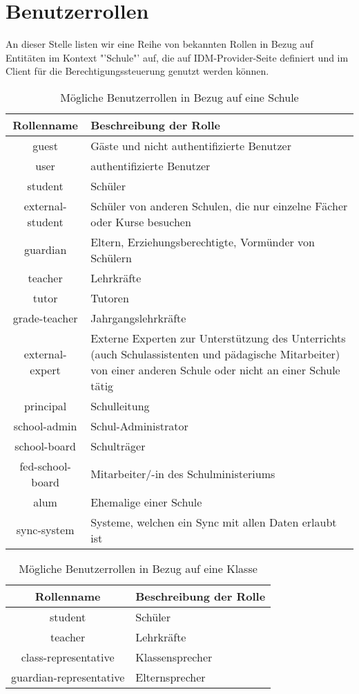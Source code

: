 \section{Benutzerrollen}
\label{Benutzerrollen}
An dieser Stelle listen wir eine Reihe von bekannten Rollen in Bezug auf Entitäten im Kontext "'Schule"' auf, die auf IDM-Provider-Seite definiert und im Client für die Berechtigungssteuerung genutzt werden können.


\begin{table}[htb]
	\begin{tabularx}{\textwidth}{|c|X|}
		\hline
\textbf{Rollenname} & \textbf{Beschreibung der Rolle} \\ \hline
guest & Gäste und nicht authentifizierte Benutzer \\ \hline
user & authentifizierte Benutzer \\ \hline
student & Schüler \\ \hline
external-student & Schüler von anderen Schulen, die nur einzelne Fächer oder Kurse besuchen \\ \hline
guardian & Eltern, Erziehungsberechtigte, Vormünder von Schülern \\ \hline
teacher & Lehrkräfte \\ \hline
tutor & Tutoren \\ \hline
grade-teacher & Jahrgangslehrkräfte \\ \hline
external-expert & Externe Experten zur Unterstützung des Unterrichts (auch Schulassistenten und pädagische Mitarbeiter) von einer anderen Schule oder nicht an einer Schule tätig \\ \hline
principal & Schulleitung \\ \hline
school-admin & Schul-Administrator \\ \hline
school-board & Schulträger \\ \hline
fed-school-board & Mitarbeiter/-in des Schulministeriums \\ \hline
alum & Ehemalige einer Schule \\ \hline
sync-system & Systeme, welchen ein Sync mit allen Daten erlaubt ist \\ \hline
\end{tabularx}
		\caption{Mögliche Benutzerrollen in Bezug auf eine Schule}
		\label{tab:intro:rolesschool}
\end{table}

\begin{table}[htb]
	\begin{tabularx}{\textwidth}{|c|X|}
		\hline
\textbf{Rollenname} & \textbf{Beschreibung der Rolle} \\ \hline
student & Schüler \\ \hline
teacher & Lehrkräfte \\ \hline
class-representative & Klassensprecher \\ \hline
guardian-representative & Elternsprecher \\ \hline

	\end{tabularx}

		\caption{Mögliche Benutzerrollen in Bezug auf eine Klasse}
		\label{tab:intro:rolesclass}
\end{table}

